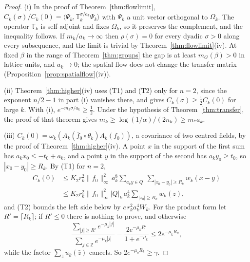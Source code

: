 \documentclass[11pt]{amsart}
\theoremstyle{definition}
\theoremstyle{remark}
\numberwithin{equation}{section}
\newcommand{\Z}{\mathbb{Z}}
\newcommand{\ip}[2]{\langle #1,#2\rangle}
\begin{document}
\begin{proof}
(i) In the proof of Theorem~\ref{thm:flowlimit},
$C_k(\sigma)/C_k(0)=\ip{\Psi_k}{\mathbb T_k^{\sigma/a_k}\Psi_k}$ with
$\Psi_k$ a unit vector orthogonal to $\Omega_k$. The operator $\mathbb T_k$
is self-adjoint and fixes $\Omega_k$, so it preserves the complement, and the
inequality follows. If $m_k/a_k\to\infty$ then $\rho(\sigma)=0$ for every
dyadic $\sigma>0$ along every subsequence, and the limit is trivial by
Theorem~\ref{thm:flowlimit}(iv). At fixed $\beta$ in the range of
Theorem~\ref{thm:groups} the gap is at least $m_G(\beta)>0$ in lattice units,
and $a_k\to0$; the spatial flow does not change the transfer matrix
(Proposition~\ref{prop:spatialflow}(iv)).

(ii) Theorem~\ref{thm:higher}(iv) uses (T1) and (T2) only for $n=2$, since
the exponent $n/2-1$ in part (i) vanishes there, and gives
$C_k(\sigma)\ge\frac12C_k(0)$ for large $k$. With (i),
$e^{-m_k\sigma/a_k}\ge\frac12$. Under the hypothesis of
Theorem~\ref{thm:transfer}, the proof of that theorem gives
$m_k\ge\log(1/\alpha)/(2n_k)\ge m_*a_k$.

(iii) $C_k(0)=\omega_k(A_k(\bar f_0\circ\theta_k)A_k(f_0))$, a covariance of
two centred fields, by the proof of Theorem~\ref{thm:higher}(iv). A point $x$
in the support of the first sum has $a_kx_0\le-t_0+a_k$, and a point $y$ in
the support of the second has $a_ky_0\ge t_0$, so $|x_0-y_0|\ge R_k$. By
(T1) for $n=2$,
\[
\begin{split}
C_k(0)&\le K_2r_k^2\|f_0\|_\infty^2\,a_k^8\sum_{a_ky\in Q}\
\sum_{|x_0-y_0|\ge R_k}w_k(x-y)\\
&\le K_2r_k^2\|f_0\|_\infty^2|Q|_k\,a_k^4\sum_{|z_0|\ge R_k}w_k(z),
\end{split}
\]
and (T2) bounds the left side below by $c\,r_k^2a_k^4W_k$. For the product
form let $R'=\lceil R_k\rceil$; if $R'\le0$ there is nothing to prove, and
otherwise
\[
\frac{\sum_{|j|\ge R'}e^{-\mu_k|j|}}{\sum_{j\in\Z}e^{-\mu_k|j|}}
=\frac{2e^{-\mu_kR'}}{1+e^{-\mu_k}}\le2e^{-\mu_kR_k},
\]
while the factor $\sum_{\bar z}u_k(\bar z)$ cancels. So
$2e^{-\mu_kR_k}\ge\gamma$.
\end{proof}
\end{document}
